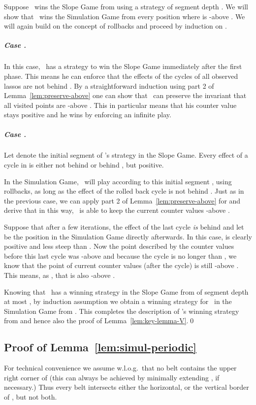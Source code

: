 Suppose \V\ wins the Slope Game from  using a strategy of segment depth .
We will show that \V\ wins the Simulation Game from every position  where
 is -above .
We will again build on the concept of rollbacks and proceed by induction on .

\subparagraph*{Case .} 
In this case, \V\ has a strategy to win the Slope Game immediately after the first phase.
This means he can enforce that the effects of the cycles of all observed lassos are not behind
.
By a straightforward induction using part 2 of Lemma~\ref{lem:preserve-above}
one can show that \V\ can preserve the invariant that all visited points
are -above . This in particular means that
his counter value stays positive and he wins by enforcing an infinite play.

\subparagraph*{Case .} 
Let  denote the initial segment of \V's strategy in the Slope Game.
Every effect of a cycle in  is either not behind  or behind
, but positive.

In the Simulation Game, \V\ will play according to this initial segment , using
rollbacks, as long as the effect of the rolled back cycle is not behind
.
Just as in the previous case, we can apply part 2 of Lemma~\ref{lem:preserve-above}
for  and derive that in this way, \V\ is able to keep the current
counter values -above .
 
Suppose that after a few iterations, the effect  of 
the last cycle \emph{is} behind  and let  be the
position in the Simulation Game directly afterwards.
In this case,  is clearly positive and less steep than
.
Now the point described by the counter values before this last cycle was -above  and because the cycle is no longer than , we know that the
point  of current counter values (after the cycle) is still
-above .
This means, as ,
that  is also -above .

Knowing that \V\ has a winning strategy in the Slope Game from  of segment depth at most , by induction assumption we obtain 
a winning strategy for \V\ in the Simulation Game from . 
This completes the description of \V's winning strategy from  and hence also
the proof of Lemma~\ref{lem:key-lemma-V}.\qed



\subsection{Proof of Lemma~\ref{lem:simul-periodic}}\label{proof:lemma:x}
For technical convenience we assume w.l.o.g.~that no belt contains the upper right corner of 
(this can always be achieved by minimally extending , if necessary.)
Thus every belt intersects either the horizontal, or the vertical border of , but not both.

